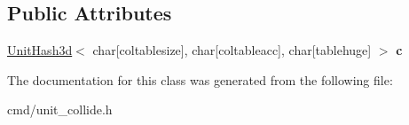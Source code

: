 \subsection*{Public Attributes}
\begin{DoxyCompactItemize}
\item 
\hyperlink{classUnitHash3d}{Unit\+Hash3d}$<$ char\mbox{[}coltablesize\mbox{]}, char\mbox{[}coltableacc\mbox{]}, char\mbox{[}tablehuge\mbox{]} $>$ {\bfseries c}\hypertarget{classCollideTable_a89bb6abecbfc9145a2179de0810b4b2f}{}\label{classCollideTable_a89bb6abecbfc9145a2179de0810b4b2f}

\end{DoxyCompactItemize}


The documentation for this class was generated from the following file\+:\begin{DoxyCompactItemize}
\item 
cmd/unit\+\_\+collide.\+h\end{DoxyCompactItemize}
